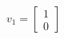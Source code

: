 \documentclass{article}
\begin{document}
\begin{align*}
v_1=\begin{bmatrix}1\\0\end{bmatrix}
\end{align*}
\end{document}
